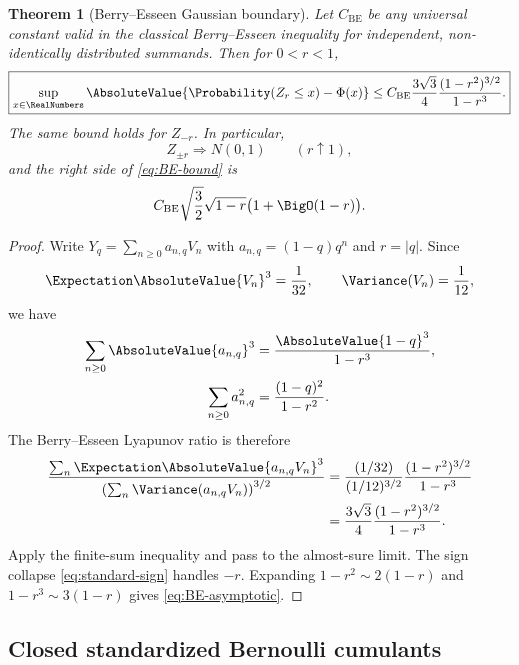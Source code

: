 \documentclass[11pt]{article}
\newtheorem{theorem}{Theorem}[section]
\theoremstyle{definition}
\newcommand{\PhiN}{\Phi}
\begin{document}
\begin{theorem}[Berry--Esseen Gaussian boundary]\label{thm:berry-esseen}
Let \(C_{\mathrm{BE}}\) be any universal constant valid in the classical
Berry--Esseen inequality for independent, non-identically distributed summands.  Then
for \(0<r<1\),
\begin{equation}
 \boxed{
 \sup_{x\in\RealNumbers}\AbsoluteValue{\Probability(Z_r\le x)-\PhiN(x)}
 \le
 C_{\mathrm{BE}}\frac{3\sqrt3}{4}
 \frac{(1-r^2)^{3/2}}{1-r^3}.}                            \label{eq:BE-bound}
\end{equation}
The same bound holds for \(Z_{-r}\).  In particular,
\begin{equation}
 Z_{\pm r}\Longrightarrow N(0,1)
 \qquad(r\uparrow1),                                     \label{eq:Gaussian-limit}
\end{equation}
and the right side of \cref{eq:BE-bound} is
\begin{equation}
 C_{\mathrm{BE}}\sqrt{\frac32}\sqrt{1-r}
 \bigl(1+\BigO(1-r)\bigr).                               \label{eq:BE-asymptotic}
\end{equation}
\end{theorem}

\begin{proof}
Write \(Y_q=\sum_{n\ge0}a_{n,q}V_n\) with
\(a_{n,q}=(1-q)q^n\) and \(r=\lvert q\rvert\).  Since
\[
 \Expectation\AbsoluteValue{V_n}^3=\frac1{32},
 \qquad
 \Variance(V_n)=\frac1{12},
\]
we have
\begin{align*}
 \sum_{n\ge0}\AbsoluteValue{a_{n,q}}^3&=\frac{\AbsoluteValue{1-q}^3}{1-r^3},\\
 \sum_{n\ge0}a_{n,q}^2&=\frac{(1-q)^2}{1-r^2}.
\end{align*}
The Berry--Esseen Lyapunov ratio is therefore
\begin{align*}
 \frac{\sum_n\Expectation\AbsoluteValue{a_{n,q}V_n}^3}
 {\left(\sum_n\Variance(a_{n,q}V_n)\right)^{3/2}}
 &=\frac{(1/32)}{(1/12)^{3/2}}
   \frac{(1-r^2)^{3/2}}{1-r^3}\\
 &=\frac{3\sqrt3}{4}\frac{(1-r^2)^{3/2}}{1-r^3}.
\end{align*}
Apply the finite-sum inequality and pass to the almost-sure limit.  The sign collapse
\cref{eq:standard-sign} handles \(-r\).  Expanding
\(1-r^2\sim2(1-r)\) and \(1-r^3\sim3(1-r)\) gives
\cref{eq:BE-asymptotic}.
\end{proof}

\subsection{Closed standardized Bernoulli cumulants}
\end{document}

